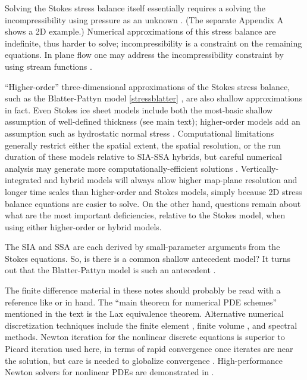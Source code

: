 \documentclass[letterpaper,final,12pt,reqno]{amsart}
\begin{document}
Solving the Stokes stress balance itself essentially requires a solving the incompressibility using pressure as an unknown \cite{Bueler2021,JouvetRappaz2011,Lengetal2012,ISMIPHOM}.  (The separate Appendix A shows a 2D example.)  Numerical approximations of this stress balance are indefinite, thus harder to solve; incompressibility is a constraint on the remaining equations.  In plane flow one may address the incompressibility constraint by using stream functions \cite{BaliseRaymond1985}.

``Higher-order'' three-dimensional approximations of the Stokes stress balance, such as the Blatter-Pattyn model \eqref{stressblatter} \cite{Blatter,Pattyn03}, are also shallow approximations in fact.  Even Stokes ice sheet models include both the most-basic shallow assumption of well-defined thickness (see main text); higher-order models add an assumption such as hydrostatic normal stress \cite{GreveBlatter2009}.  Computational limitations generally restrict either the spatial extent, the spatial resolution, or the run duration of these models relative to SIA-SSA hybrids, but careful numerical analysis may generate more computationally-efficient solutions \cite{Brown2013}.  Vertically-integrated and hybrid models will always allow higher map-plane resolution and longer time scales than higher-order and Stokes models, simply because 2D stress balance equations are easier to solve.  On the other hand, questions remain about what are the most important deficiencies, relative to the Stokes model, when using either higher-order \cite{ISMIPHOM} or hybrid models.

The SIA and SSA are each derived by small-parameter arguments from the Stokes equations.  So, is there is a common shallow antecedent model?  It turns out that the Blatter-Pattyn model is such an antecedent \cite{SchoofHindmarsh}.

The finite difference material in these notes should probably be read with a reference like \cite{LeVequeFD} or \cite{MortonMayers} in hand.  The ``main theorem for numerical PDE schemes'' mentioned in the text is the Lax equivalence theorem.  Alternative numerical discretization techniques include the finite element \cite{Braess}, finite volume \cite{LeVeque}, and spectral \cite{Trefethen} methods.  Newton iteration for the nonlinear discrete equations is superior to Picard iteration used here, in terms of rapid convergence once iterates are near the solution, but care is needed to globalize convergence \cite{Kelley}.  High-performance Newton solvers for nonlinear PDEs are demonstrated in \cite{Bueler2021}.
\end{document}
